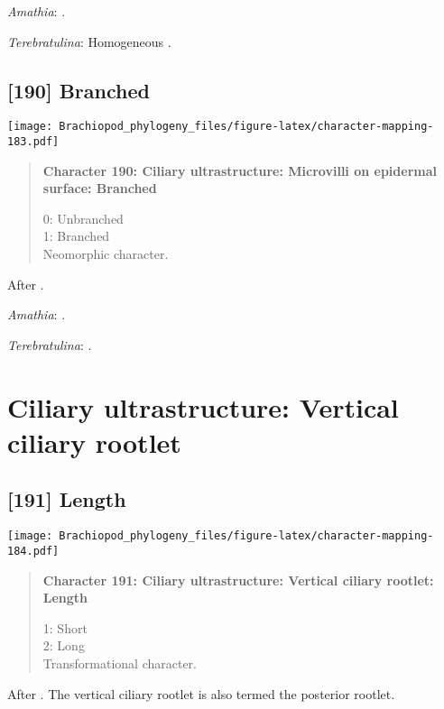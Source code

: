 \documentclass[openany]{book}
\theoremstyle{definition}
\theoremstyle{definition}
\theoremstyle{definition}
\theoremstyle{remark}
\begin{document}
\hypertarget{Amathia-coding-189}{}
\emph{Amathia}: \citet{Reed1982}.

\hypertarget{Terebratulina-coding-189}{}
\emph{Terebratulina}: Homogeneous \citep{Luter1995}.

\subsection*{{[}190{]} Branched}\label{branched}

\texttt{[image: Brachiopod\_phylogeny\_files/figure-latex/character-mapping-183.pdf]}

\begin{quote}
\textbf{Character 190: Ciliary ultrastructure: Microvilli on epidermal
surface: Branched}

0: Unbranched\\
1: Branched\\
Neomorphic character.
\end{quote}

After \citet{Lundin2009}.

\hypertarget{Amathia-coding-190}{}
\emph{Amathia}: \citet{Reed1982}.

\hypertarget{Terebratulina-coding-190}{}
\emph{Terebratulina}: \citep{Luter1995}.

\section{Ciliary ultrastructure: Vertical ciliary
rootlet}\label{ciliary-ultrastructure-vertical-ciliary-rootlet}

\subsection*{{[}191{]} Length}\label{length}

\texttt{[image: Brachiopod\_phylogeny\_files/figure-latex/character-mapping-184.pdf]}

\begin{quote}
\textbf{Character 191: Ciliary ultrastructure: Vertical ciliary rootlet:
Length}

1: Short\\
2: Long\\
Transformational character.
\end{quote}

After \citet{Lundin2009}. The vertical ciliary rootlet is also termed
the posterior rootlet.
\end{document}
